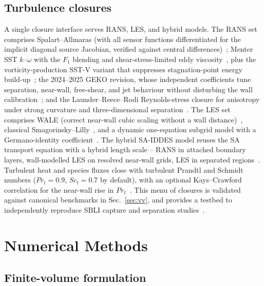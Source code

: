\documentclass[journal,biblatex]{new-aiaa}
\begin{document}
\subsection{Turbulence closures}
\label{sec:turb}

A single closure interface serves RANS, LES, and hybrid models. The RANS set comprises Spalart--Allmaras (with all sensor functions differentiated for the implicit diagonal source Jacobian, verified against central differences)~\cite{spalart_one-equation_1992}; Menter SST $k$--$\omega$ with the $F_1$ blending and shear-stress-limited eddy viscosity~\cite{menter_two-equation_1994,wilcox_turbulence_2006}, plus the vorticity-production SST-V variant that suppresses stagnation-point energy build-up~\cite{menter_ten_2003}; the 2024--2025 GEKO revision, whose independent coefficients tune separation, near-wall, free-shear, and jet behaviour without disturbing the wall calibration~\cite{menter_generalized_2025}; and the Launder--Reece--Rodi Reynolds-stress closure for anisotropy under strong curvature and three-dimensional separation~\cite{launder_progress_1975}. The LES set comprises WALE (correct near-wall cubic scaling without a wall distance)~\cite{nicoud_subgrid-scale_1999}, classical Smagorinsky--Lilly~\cite{smagorinsky_general_1963,lilly_application_1966}, and a dynamic one-equation subgrid model with a Germano-identity coefficient~\cite{kim_new_1995,germano_dynamic_1991}. The hybrid SA-IDDES model reuses the SA transport equation with a hybrid length scale -- RANS in attached boundary layers, wall-modelled LES on resolved near-wall grids, LES in separated regions~\cite{shur_hybrid_2008,spalart_new_2006}. Turbulent heat and species fluxes close with turbulent Prandtl and Schmidt numbers ($Pr_t=0.9$, $Sc_t=0.7$ by default), with an optional Kays--Crawford correlation for the near-wall rise in $Pr_t$~\cite{kays_turbulent_1994,kays_convective_2005}. This menu of closures is validated against canonical benchmarks in Sec.~\ref{sec:vv}, and provides a testbed to independently reproduce SBLI capture and separation studies~\cite{maclean_ground_2008, wadhams_ground_2008}.

\section{Numerical Methods}
\label{sec:numerics}

\subsection{Finite-volume formulation}
\end{document}
